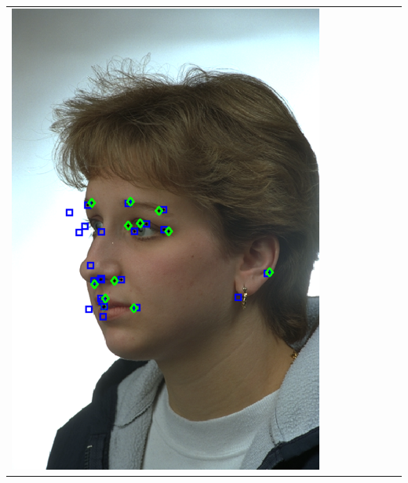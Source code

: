 \documentclass[portrait,final,a0paper,fontscale=0.277]{baposter}
\begin{document}
\begin{poster}
{{\begin{tabular}{@{}rccccccc@{}}
\parbox[c]{0.11\linewidth}{\includegraphics[width=\linewidth]{images/l_hl_success_1.pdf}} &

\end{tabular}}}
\end{poster}
\end{document}
